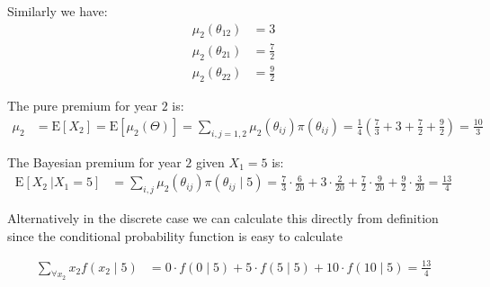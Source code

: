 \documentclass[english,12pt]{article}
\theoremstyle{plain}
\theoremstyle{definition}
\theoremstyle{definition} %
\newcommand{\ex}[1]{\mbox{E} \left[ #1 \right]}
\newcommand{\condex}[2]{\mbox{E} \left[ \left. #1 \ \right\vert \left. #2 \right. \right]}
\begin{document}
{Similarly we have:
\begin{align*}
\mu_2(\theta_{12})&=3\\
\mu_2(\theta_{21})&=\frac{7}{2}\\
\mu_2(\theta_{22})&=\frac{9}{2}
\end{align*}

\item The pure premium for year $2$ is:
\begin{align*}
\mu_2
&=\ex{X_2}
=\ex{\mu_2(\Theta)}
=\sum\limits_{i,j=1,2}\mu_2(\theta_{ij})\pi(\theta_{ij})
=\frac{1}{4}\left(\frac{7}{3}+3+\frac{7}{2}+\frac{9}{2}\right)
=\frac{10}{3}
\end{align*}

\item The Bayesian premium for year $2$ given $X_1=5$ is:
\begin{align*}
\condex{X_2}{X_1=5}
&=\sum\limits_{i,j}\mu_2(\theta_{ij})\pi(\theta_{ij}\mid 5)
=\frac{7}{3}\cdot\frac{6}{20}+3\cdot\frac{2}{20}+\frac{7}{2}\cdot\frac{9}{20}+\frac{9}{2}\cdot\frac{3}{20}
=\frac{13}{4}
\end{align*}

Alternatively in the discrete case we can calculate this directly from definition since the conditional probability function is easy to calculate

\begin{align*}
\sum\limits_{\forall x_2}x_2f(x_2\mid 5)
&=0\cdot f(0\mid 5)+5\cdot f(5\mid 5)+10\cdot f(10\mid 5)
=\frac{13}{4}\\
\end{align*}
}
\end{document}
